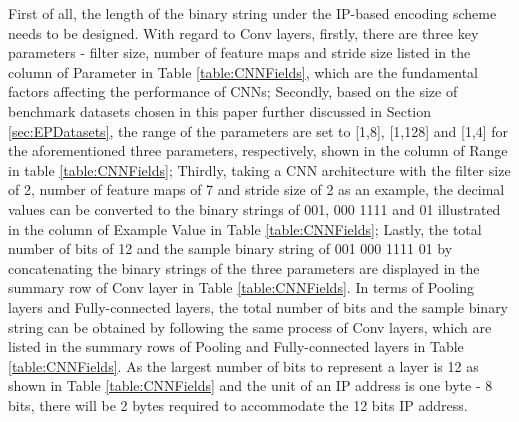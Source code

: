 \documentclass[conference]{IEEEtran}
\begin{document}
First of all, the length of the binary string under the IP-based encoding scheme needs to be designed. With regard to Conv layers, firstly, there are three key parameters - filter size, number of feature maps and stride size listed in the column of Parameter in Table \ref{table:CNNFields}, which are the fundamental factors affecting the performance of CNNs; Secondly, based on the size of benchmark datasets chosen in this paper further discussed in Section \ref{sec:EPDatasets}, the range of the parameters are set to [1,8], [1,128] and [1,4] for the aforementioned three parameters, respectively, shown in the column of Range in table \ref{table:CNNFields}; Thirdly, taking a CNN architecture with the filter size of 2, number of feature maps of 7 and stride size of 2 as an example, the decimal values can be converted to the binary strings of 001, 000 1111 and 01 illustrated in the column of Example Value in Table \ref{table:CNNFields}; Lastly, the total number of bits of 12 and the sample binary string of 001 000 1111 01 by concatenating the binary strings of the three parameters are displayed in the summary row of Conv layer in Table \ref{table:CNNFields}. In terms of Pooling layers and Fully-connected layers, the total number of bits and the sample binary string can be obtained by following the same process of Conv layers, which are listed in the summary rows of Pooling and Fully-connected layers in Table \ref{table:CNNFields}.  As the largest number of bits to represent a layer is 12 as shown in Table \ref{table:CNNFields} and the unit of an IP address is one byte - 8 bits, there will be 2 bytes required to accommodate the 12 bits IP address. 
\end{document}
